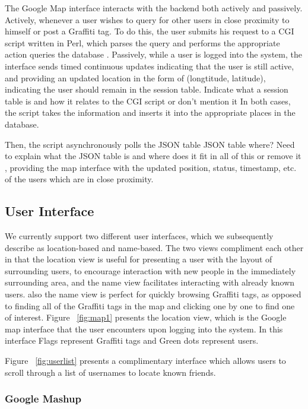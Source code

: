\documentclass[11pt]{article}
\begin{document}
The Google Map interface interacts with the backend both actively and passively. Actively, whenever a user wishes to query for other users in close proximity to himself or post a Graffiti tag. To do this, the user submits his request to a CGI script written in Perl, which parses the query and performs the appropriate action {\color{red}  queries the database} . Passively, while a user is logged into the system, the interface sends timed continuous updates indicating that the user is still active, and providing an updated location in the form of (longtitude, latitude), indicating the user should remain in the session table. {\color{red}  Indicate what a session table is and how it relates to the CGI script or don't mention it} In both cases, the script takes the information and inserts it into the appropriate places in the database. 

Then, the script asynchronously polls the JSON table {\color{red}  JSON table where? Need to explain what the JSON table is and where does it fit in all of this or remove it} , providing the map interface with the updated position, status, timestamp, etc. of the users which are in close proximity. 

\subsection{User Interface}

We currently support two different user interfaces, which we subsequently describe as location-based and name-based. The two views compliment each other in that the location view is useful for presenting a user with the layout of surrounding users, to encourage interaction with new people in the immediately surrounding area, and the name view facilitates interacting with already known users. also the name view is perfect for quickly browsing Graffiti tags, as opposed to finding all of the Graffiti tags in the map and clicking one by one to find one of interest. Figure ~\ref{fig:map1} presents the location view, which is the Google map interface that the user encounters upon logging into the system. In this interface Flags represent Graffiti tags and Green dots represent users.

Figure ~\ref{fig:userlist} presents a complimentary interface which allows users to scroll through a list of usernames to locate known friends.

\subsubsection{Google Mashup}
\end{document}
